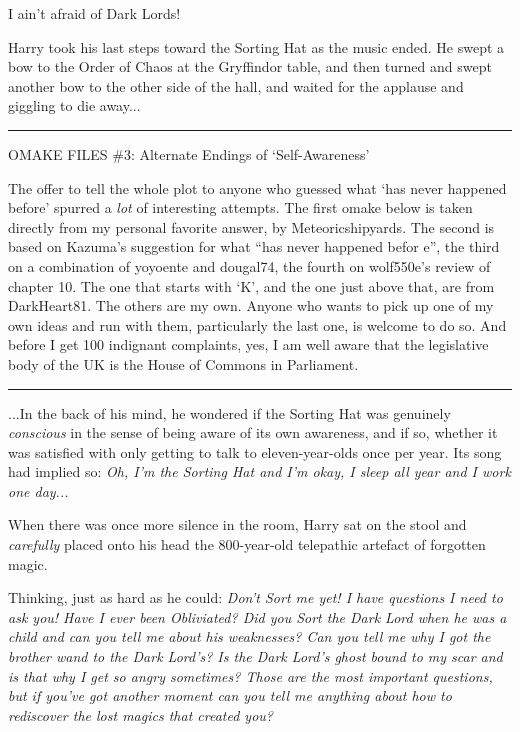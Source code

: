 I ain't afraid of Dark Lords!

Harry took his last steps toward the Sorting Hat as the music ended. He swept a bow to the Order of Chaos at the Gryffindor table, and then turned and swept another bow to the other side of the hall, and waited for the applause and giggling to die away...

\begin{center}\rule{3in}{0.4pt}\end{center}

OMAKE FILES \#3: Alternate Endings of `Self-Awareness'

The offer to tell the whole plot to anyone who guessed what `has never happened before' spurred a \emph{lot} of interesting attempts. The first omake below is taken directly from my personal favorite answer, by Meteoricshipyards. The second is based on Kazuma's suggestion for what ``has never happened befor e'', the third on a combination of yoyoente and dougal74, the fourth on wolf550e's review of chapter 10. The one that starts with `K', and the one just above that, are from DarkHeart81. The others are my own. Anyone who wants to pick up one of my own ideas and run with them, particularly the last one, is welcome to do so. And before I get 100 indignant complaints, yes, I am well aware that the legislative body of the UK is the House of Commons in Parliament.

\begin{center}\rule{3in}{0.4pt}\end{center}

...In the back of his mind, he wondered if the Sorting Hat was genuinely \emph{conscious} in the sense of being aware of its own awareness, and if so, whether it was satisfied with only getting to talk to eleven-year-olds once per year. Its song had implied so: \emph{Oh, I'm the Sorting Hat and I'm okay, I sleep all year and I work one day...}

When there was once more silence in the room, Harry sat on the stool and \emph{carefully} placed onto his head the 800-year-old telepathic artefact of forgotten magic.

Thinking, just as hard as he could: \emph{Don't Sort me yet! I have questions I need to ask you! Have I ever been Obliviated? Did you Sort the Dark Lord when he was a child and can you tell me about his weaknesses? Can you tell me why I got the brother wand to the Dark Lord's? Is the Dark Lord's ghost bound to my scar and is that why I get so angry sometimes? Those are the most important questions, but if you've got another moment can you tell me anything about how to rediscover the lost magics that created you?}

